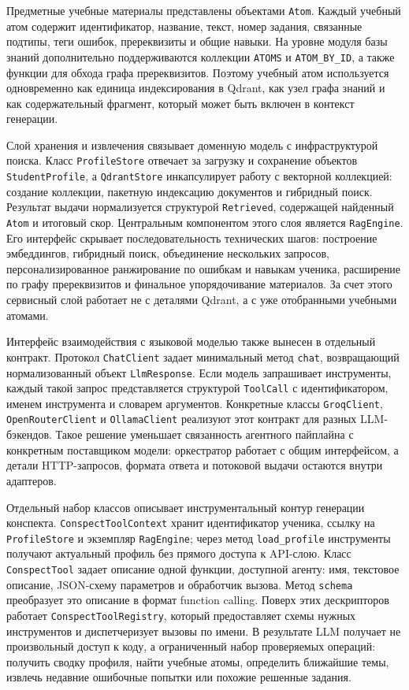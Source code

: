 \documentclass[a4paper,12pt]{extarticle}
\begin{document}
Предметные учебные материалы представлены объектами \texttt{Atom}. Каждый учебный
атом содержит идентификатор, название, текст, номер задания, связанные подтипы,
теги ошибок, пререквизиты и общие навыки. На уровне модуля базы знаний дополнительно
поддерживаются коллекции \texttt{ATOMS} и \texttt{ATOM\_BY\_ID}, а также функции для
обхода графа пререквизитов. Поэтому учебный атом используется одновременно как
единица индексирования в Qdrant, как узел графа знаний и как содержательный фрагмент,
который может быть включен в контекст генерации.

Слой хранения и извлечения связывает доменную модель с инфраструктурой поиска. Класс
\texttt{ProfileStore} отвечает за загрузку и сохранение объектов \texttt{StudentProfile},
а \texttt{QdrantStore} инкапсулирует работу с векторной коллекцией: создание коллекции,
пакетную индексацию документов и гибридный поиск. Результат выдачи нормализуется
структурой \texttt{Retrieved}, содержащей найденный \texttt{Atom} и итоговый скор.
Центральным компонентом этого слоя является \texttt{RagEngine}. Его интерфейс скрывает
последовательность технических шагов: построение эмбеддингов, гибридный поиск,
объединение нескольких запросов, персонализированное ранжирование по ошибкам и
навыкам ученика, расширение по графу пререквизитов и финальное упорядочивание
материалов. За счет этого сервисный слой работает не с деталями Qdrant, а с уже
отобранными учебными атомами.

Интерфейс взаимодействия с языковой моделью также вынесен в отдельный контракт.
Протокол \texttt{ChatClient} задает минимальный метод \texttt{chat}, возвращающий
нормализованный объект \texttt{LlmResponse}. Если модель запрашивает инструменты,
каждый такой запрос представляется структурой \texttt{ToolCall} с идентификатором,
именем инструмента и словарем аргументов. Конкретные классы \texttt{GroqClient},
\texttt{OpenRouterClient} и \texttt{OllamaClient} реализуют этот контракт для разных
LLM-бэкендов. Такое решение уменьшает связанность агентного пайплайна с конкретным
поставщиком модели: оркестратор работает с общим интерфейсом, а детали HTTP-запросов,
формата ответа и потоковой выдачи остаются внутри адаптеров.

Отдельный набор классов описывает инструментальный контур генерации конспекта.
\texttt{ConspectToolContext} хранит идентификатор ученика, ссылку на
\texttt{ProfileStore} и экземпляр \texttt{RagEngine}; через метод \texttt{load\_profile}
инструменты получают актуальный профиль без прямого доступа к API-слою. Класс
\texttt{ConspectTool} задает описание одной функции, доступной агенту: имя,
текстовое описание, JSON-схему параметров и обработчик вызова. Метод
\texttt{schema} преобразует это описание в формат function calling. Поверх этих
дескрипторов работает \texttt{ConspectToolRegistry}, который предоставляет схемы
нужных инструментов и диспетчеризует вызовы по имени. В результате LLM получает
не произвольный доступ к коду, а ограниченный набор проверяемых операций: получить
сводку профиля, найти учебные атомы, определить ближайшие темы, извлечь недавние
ошибочные попытки или похожие решенные задания.
\end{document}
